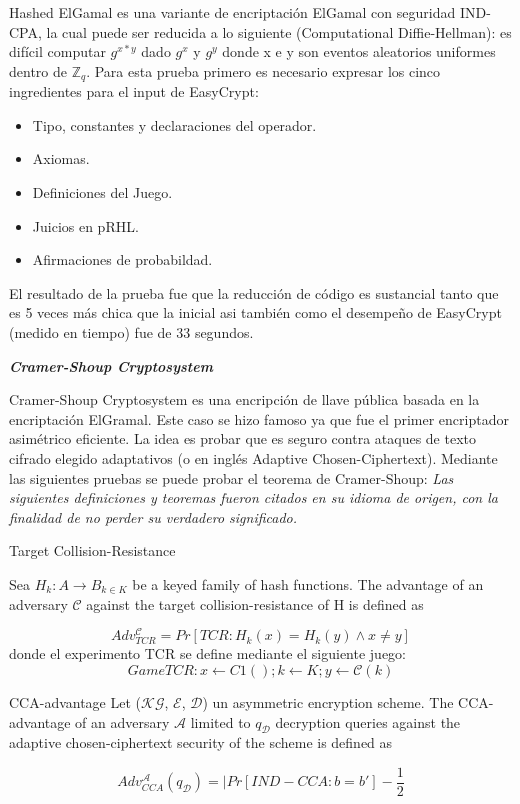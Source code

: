 \documentclass[runningheads,a4paper]{llncs}
\begin{document}
Hashed ElGamal es una variante de encriptación ElGamal con seguridad IND-CPA, la cual puede ser reducida a lo siguiente (Computational Diffie-Hellman): es difícil computar $g^{x*y}$ dado $g^x$ y $g^y$ donde x e y son eventos aleatorios uniformes dentro de $\mathbb{Z}_q$.
Para esta prueba primero es necesario expresar los cinco ingredientes para el input de EasyCrypt:
\begin{itemize}
	\item Tipo, constantes y declaraciones del operador.
	\item Axiomas.
	\item Definiciones del Juego.
	\item Juicios en pRHL.
	\item Afirmaciones de probabildad.
\end{itemize}

El resultado de la prueba fue que la reducción de código es sustancial tanto que es 5 veces más chica que la inicial asi también como el desempeño de EasyCrypt (medido en tiempo) fue de 33 segundos.\cite{article3}




\centerline{\textbf{{\emph{Cramer-Shoup Cryptosystem}}}}

Cramer-Shoup Cryptosystem es una encripción de llave pública basada en la encriptación ElGramal. Este caso se hizo famoso ya que fue el primer encriptador asimétrico eficiente. La idea es probar que es seguro contra ataques de texto cifrado elegido adaptativos (o en inglés Adaptive Chosen-Ciphertext).
Mediante las siguientes pruebas se puede probar el teorema de Cramer-Shoup:
\emph{Las siguientes definiciones y teoremas fueron citados en su idioma de origen, con la finalidad de no perder su verdadero significado.}
\begin{definition}{Target Collision-Resistance}

Sea $H_k : A \rightarrow B_{k∈K}$ be a keyed family of hash
functions. The advantage of an adversary $\mathcal{C}$ against the target collision-resistance of H is defined as

	\[Adv_{TCR}^\mathcal{C} = Pr[TCR:H_k(x) = H_k (y) \land x \neq y]\]
	donde el experimento TCR se define mediante el siguiente juego:
	\[Game TCR : x \leftarrow C 1 ( ); k \leftarrow K; y \leftarrow \mathcal{C}(k)\]
\end{definition}

\begin{definition}{CCA-advantage}
Let ($\mathcal{K}\mathcal{G}$, $\mathcal{E}$, $\mathcal{D}$) un asymmetric encryption scheme. The CCA-advantage of an adversary $\mathcal{A}$ limited to $q_\mathcal{D}$ decryption queries against the adaptive chosen-ciphertext security of the scheme is defined as

\[Adv_{CCA}^\mathcal{A} (q_\mathcal{D})= |Pr[IND-CCA: b=b'] - \frac{1}{2}\]
\end{definition}
\end{document}
